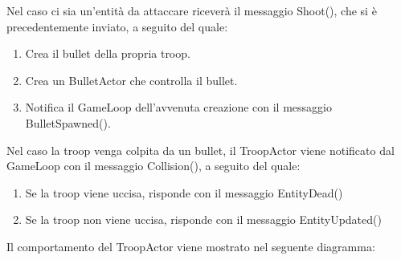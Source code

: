 Nel caso ci sia un'entità da attaccare riceverà il messaggio Shoot(), che si è precedentemente inviato, a seguito del quale:

\begin{enumerate}
    \item Crea il bullet della propria troop.
    \item Crea un BulletActor che controlla il bullet.
    \item Notifica il GameLoop dell'avvenuta creazione con il messaggio BulletSpawned().
\end{enumerate}

Nel caso la troop venga colpita da un bullet, il TroopActor viene notificato dal GameLoop con il messaggio Collision(), a seguito del quale:

\begin{enumerate}
    \item Se la troop viene uccisa, risponde con il messaggio EntityDead()
    \item Se la troop non viene uccisa, risponde con il messaggio EntityUpdated()
\end{enumerate}

Il comportamento del TroopActor viene mostrato nel seguente diagramma:

